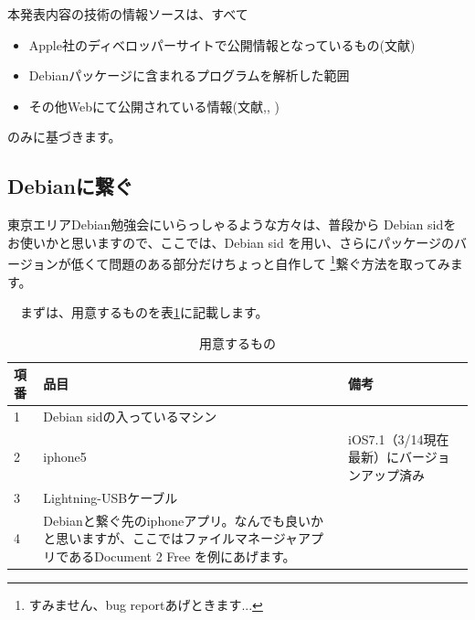 \documentclass[mingoth,a4paper]{jsarticle}
\begin{document}
 本発表内容の技術の情報ソースは、すべて

\begin{itemize}
\item Apple社のディベロッパーサイトで公開情報となっているもの(文献\cite{apple-fs-program-ref})
\item Debianパッケージに含まれるプログラムを解析した範囲
\item その他Webにて公開されている情報(文献\cite{usb-mux-desc},\cite{afc-desc},
\cite{iphone-hacking-accessories-desc})
\end{itemize}

のみに基づきます。

\subsection{Debianに繋ぐ}

 東京エリアDebian勉強会にいらっしゃるような方々は、普段から
Debian sidをお使いかと思いますので、ここでは、Debian sid
を用い、さらにパッケージのバージョンが低くて問題のある部分だけちょっと自作して
\footnote{すみません、bug reportあげときます...}繋ぐ方法を取ってみます。

　まずは、用意するものを表\ref{tab:iphone5-debian-prerequisite}に記載します。

\begin{table}[ht]
\begin{center}
\begin{tabular}{|l|p{7cm}|l|}
\hline 
項番 & 品目 & 備考 \\ \hline
1 & Debian sidの入っているマシン & \\ \hline
2 & iphone5 & iOS7.1（3/14現在最新）にバージョンアップ済み \\ \hline
3 & Lightning-USBケーブル & \\ \hline
4 & Debianと繋ぐ先のiphoneアプリ。なんでも良いかと思いますが、ここではファイルマネージャアプリであるDocument 2 Free を例にあげます。& \\ \hline
\end{tabular}
\caption{用意するもの}\label{tab:iphone5-debian-prerequisite}
\end{center}
\end{table}
\end{document}
